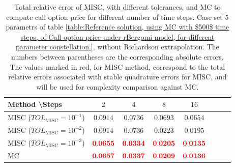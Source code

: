 \FloatBarrier
%
%
%
\begin{table}[h!]
	\centering
	\begin{tabular}{l*{6}{c}r}
		Method \textbackslash  Steps            & $2$ & $4$ & $8$ & $16$  \\
		\hline
		MISC ($TOL_{\text{MISC}}=10^{-1}$)  & $\mathbf{0.0914}$ & $\mathbf{0.0736}$& $\mathbf{ 0.0693}$ & $\mathbf{ 0.0654}$   \\
		MISC ($TOL_{\text{MISC}}=10^{-2}$)  &  $\mathbf{0.0914}$& $\mathbf{0.0736}$& $\mathbf{ 0.0223}$ & $\mathbf{ 0.0195}$  \\
		MISC ($TOL_{\text{MISC}}=10^{-3}$)  &  $\mathbf{{\color{red}0.0655}}$& $\mathbf{{\color{red}0.0334}}$& $\mathbf{{\color{red}0.0205}}$  & $\mathbf{ {\color{red}0.0135}}$  \\
		\hline
		MC    & $\mathbf{{\color{red}0.0657}}$  & $\mathbf{ {\color{red}0.0337}}$  & $\mathbf{{\color{red}0.0209}}$ & $\mathbf{ {\color{red}0.0136}}$  \\		
		\hline
	\end{tabular}
	\caption{Total relative error of MISC, with  different tolerances,  and MC to compute call option price  for different number of time steps. Case  set $5$ parametrs of table \ref{table:Reference solution, using MC with $500$ time steps, of Call option price under rBergomi model, for different parameter constellation.}, without Richardson extrapolation. The numbers between parentheses are the corresponding absolute errors. The values marked in red, for MISC method, correspond to the total relative errors associated with  stable quadrature errors for MISC, and will be used for complexity comparison against MC.}
	\label{Total error of MISC and MC to compute Call option price of the different tolerances for different number of time steps. Case set 5, without Richardson extrapolation. The numbers between parentheses are the corresponding absolute errors.}
\end{table}

